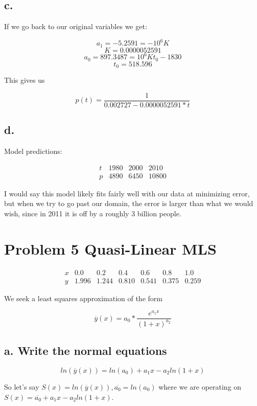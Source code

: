 \documentclass[]{article}
\begin{document}
\subsection{c.}\label{c.}

If we go back to our original variables we get:

\[a_1 = -5.2591 = -10^6K\] \[K = 0.0000052591\]
\[a_0 = 897.3487 = 10^6Kt_0-1830\] \[t_0 = 518.596\]

This gives us

\[p(t) = \frac1{0.002727-0.0000052591*t}\]

\subsection{d.}\label{d.}

Model predictions:

\[
\begin{array}{c|c|c|c} 
t & 1980 & 2000 & 2010\\
p & 4890 & 6450 & 10800
\end{array}
\]

I would say this model likely fits fairly well with our data at
minimizing error, but when we try to go past our domain, the error is
larger than what we would wish, since in 2011 it is off by a roughly 3
billion people.

\section{Problem 5 Quasi-Linear MLS}\label{problem-5-quasi-linear-mls}

\[
\begin{array}{c|c|c|c|c|c|c} 
x & 0.0 & 0.2 & 0.4 & 0.6 & 0.8 & 1.0\\
y & 1.996 & 1.244 & 0.810 & 0.541 & 0.375 & 0.259
\end{array}
\]

We seek a least squares approximation of the form

\[\overline y(x) = a_0*\frac{e^{a_1x}}{(1+x)^{a_2}}\]

\subsection{a. Write the normal
equations}\label{a.-write-the-normal-equations}

\[ln(\overline y(x)) = ln(a_0) + a_1x - a_2ln(1+x)\]

So let's say \(S(x) = ln(\overline y(x)), \overline {a_0}=ln(a_0)\)
where we are operating on \(S(x) = \overline{a_0} +a_1x - a_2ln(1+x)\).
\end{document}
